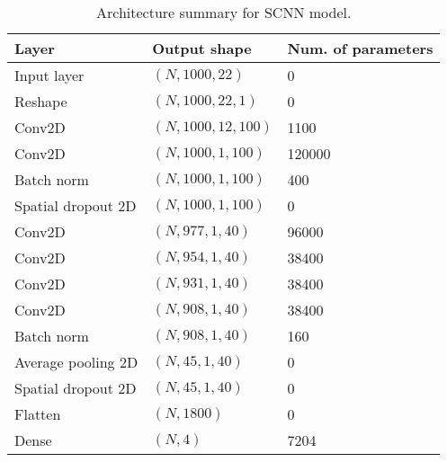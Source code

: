 \documentclass{article}
\begin{document}
\begin{table}[H]
\small
\begin{center}
    \begin{tabular}{|l|l|l|}
        \hline
        Layer   & Output shape  & Num. of parameters \\
        \hline\hline
        Input layer         & $(N, 1000, 22)$       & 0         \\
        Reshape             & $(N, 1000, 22, 1)$    & 0         \\
        Conv2D              & $(N, 1000, 12, 100)$  & 1100      \\
        Conv2D              & $(N, 1000, 1, 100)$   & 120000    \\
        Batch norm          & $(N, 1000, 1, 100)$   & 400       \\
        Spatial dropout 2D  & $(N, 1000, 1, 100)$   & 0         \\
        Conv2D              & $(N, 977, 1, 40)$     & 96000     \\
        Conv2D              & $(N, 954, 1,40)$      & 38400     \\
        Conv2D              & $(N, 931, 1, 40)$     & 38400     \\
        Conv2D              & $(N, 908, 1, 40)$     & 38400     \\
        Batch norm          & $(N, 908, 1, 40)$     & 160       \\
        Average pooling 2D  & $(N, 45, 1, 40)$      & 0         \\
        Spatial dropout 2D  & $(N, 45, 1, 40)$      & 0         \\
        Flatten             & $(N, 1800)$           & 0         \\
        Dense               & $(N, 4)$              & 7204      \\
        \hline
    \end{tabular}
\end{center}
\caption{Architecture summary for SCNN model.}
\label{tab:scnn}
\end{table}
\end{document}
